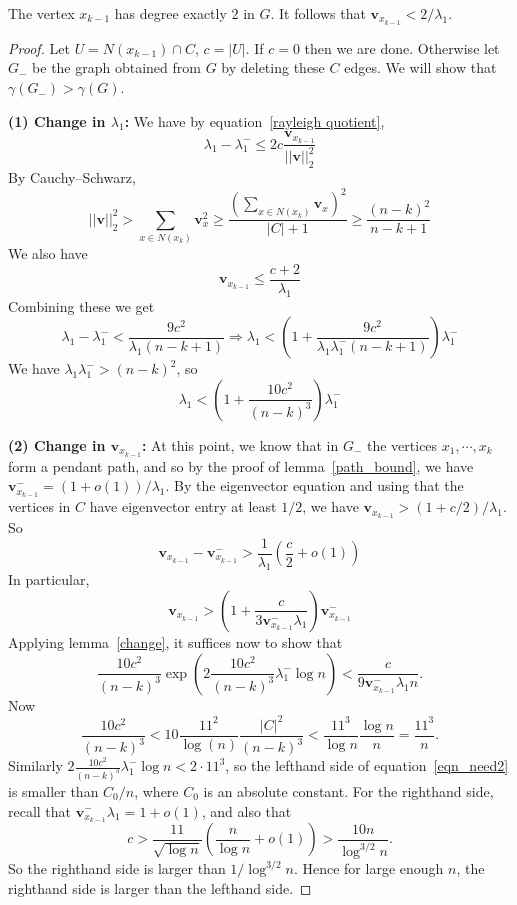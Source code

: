\begin{lemma}\label{k_1_lemma}
 The vertex $x_{k-1}$ has degree exactly $2$ in $G$.  It follows that
 $\mathbf{v}_{x_{k-1}} < 2 / \lambda_1$.
\end{lemma}
\begin{proof}
  Let $U = N(x_{k-1}) \cap C$, $c = |U|$.  If $c=0$ then we are done.
  Otherwise let $G_-$ be the graph obtained from $G$ by deleting these
  $C$ edges.  We will show that $\gamma(G_-) > \gamma(G)$.

  \noindent \textbf{(1) Change in $\lambda_1$:}
  We have by equation~\ref{rayleigh quotient}, 
   \[ \lambda_1 - \lambda^{-}_1 \leq 2c \frac{\mathbf{v}_{x_{k-1}}}{||\mathbf{v}||_2^2}\]
  By Cauchy--Schwarz,
   \[ ||\mathbf{v}||_2^2 > \sum_{x \in N(x_{k})} \mathbf{v}_x^2 \geq \frac{\left(\sum_{x \in N(x_k)} \mathbf{v}_x\right)^2}{|C|+1} \geq \frac{(n-k)^2}{n-k+1}\]
  We also have
   \[ \mathbf{v}_{x_{k-1}} \leq \frac{c+2}{\lambda_1}\]
  Combining these we get
   \[ \lambda_1 - \lambda_1^{-} < \frac{9c^2}{\lambda_1 (n-k+1)} \Rightarrow \lambda_1 < \left(1 + \frac{9c^2}{\lambda_1 \lambda_1^{-} (n-k+1)}\right) \lambda_1^{-}\]
  We have $\lambda_1 \lambda_1^{-} > (n-k)^2$, so
  \[ \lambda_1 < \left( 1 + \frac{10c^2}{(n-k)^3} \right) \lambda_1^{-} \]
  
  \noindent \textbf{(2) Change in $\mathbf{v}_{x_{k-1}}$:}
  At this point, we know that in $G_-$ the vertices $x_1,\cdots , x_{k}$ form a pendant path, and so by the proof of lemma~\ref{path_bound}, we have $\mathbf{v}_{x_{k-1}}^- = (1+o(1)) / \lambda_1$. By the eigenvector equation and using that the vertices in $C$ have eigenvector entry at least $1/2$, we have $\mathbf{v}_{x_{k-1}} > (1 + c/2) / \lambda_1$.  So
   \begin{equation*}
     \mathbf{v}_{x_{k-1}} - \mathbf{v}_{x_{k-1}}^{-} > \frac{1}{\lambda_1} \left( \frac{c}{2} + o(1) \right)
   \end{equation*}
   In particular,
    \[ \mathbf{v}_{x_{k-1}} > \left( 1 + \frac{c}{3 \mathbf{v}_{x_{k-1}}^{-}\lambda_1}\right) \mathbf{v}_{x_{k-1}}^-\]
   Applying lemma~\ref{change}, it suffices now to show that
   \begin{equation}\label{eqn_need2}
    \frac{10c^2}{(n-k)^3} \exp \left(2 \frac{10c^2}{(n-k)^3} \lambda_1^- \log n \right) < \frac{c}{9 \mathbf{v}_{x_{k-1}}^- \lambda_1 n} .
   \end{equation}
   Now
    \[ \frac{10c^2}{(n-k)^3} < 10 \frac{11^2}{\log(n)} \frac{|C|^2}{(n-k)^3} < \frac{11^3}{\log n} \frac{\log n}{n} = \frac{11^3}{n} .\]
    Similarly $2 \frac{10c^2}{(n-k)^3} \lambda_1^- \log n < 2\cdot 11^3$, so the lefthand side of equation~\ref{eqn_need2} is smaller than $C_0 / n$, where
   $C_0$ is an absolute constant.
   For the righthand side, recall that $\mathbf{v}_{x_{k-1}}^- \lambda_1 = 1 + o(1)$, and also that
    \[ c > \frac{11}{\sqrt{\log n}} \left( \frac{n}{\log n} + o(1) \right) > \frac{10n}{\log^{3/2} n} .\]
   So the righthand side is larger than $1 / \log^{3/2}{n}$.  Hence for large
   enough $n$, the righthand side is larger than the lefthand side.
  
\end{proof}

